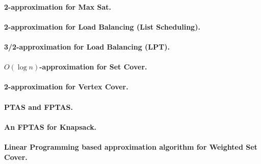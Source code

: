 \documentclass[11pt,a4paper]{article}
\theoremstyle{definition}
\begin{document}
\paragraph{2-approximation for Max Sat.}

\paragraph{2-approximation for Load Balancing (List Scheduling).}

\paragraph{3/2-approximation for Load Balancing (LPT).}

\paragraph{$O(\log n)$-approximation for Set Cover.}

\paragraph{2-approximation for Vertex Cover.}

\paragraph{PTAS and FPTAS.}

\paragraph{An FPTAS for Knapsack.}

\paragraph{Linear Programming based approximation algorithm for Weighted Set Cover.}
\end{document}
